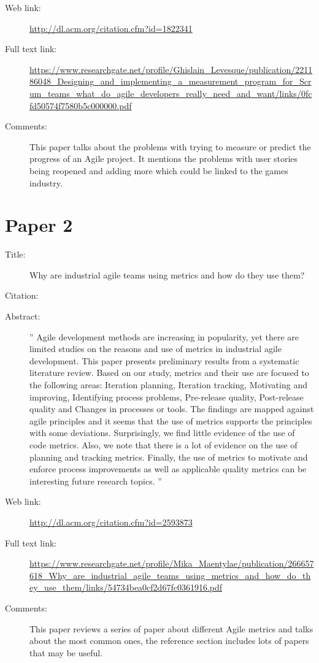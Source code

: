 \documentclass{scrartcl}
\begin{document}
\begin{description}
	\item[Web link:] \url{http://dl.acm.org/citation.cfm?id=1822341}
	\item[Full text link:] \url{https://www.researchgate.net/profile/Ghislain_Levesque/publication/221186048_Designing_and_implementing_a_measurement_program_for_Scrum_teams_what_do_agile_developers_really_need_and_want/links/0fcfd50574f7580b5c000000.pdf}
	\item[Comments:] This paper talks about the problems with trying to measure or predict the progress of an Agile project. It mentions the problems with user stories being reopened and adding more which could be linked to the games industry. 
\end{description}

\section*{Paper 2}
\begin{description}
	\item[Title:] Why are industrial agile teams using metrics and how do they use them?
	\item[Citation:] \cite{Kupiainen}
	\item[Abstract:]'' Agile development methods are increasing in popularity, yet there are limited studies on the reasons and use of metrics in industrial agile development. This paper presents preliminary results from a systematic literature review. Based on our study, metrics and their use are focused to the following areas: Iteration planning, Iteration tracking, Motivating and improving, Identifying process problems, Pre-release quality, Post-release quality and Changes in processes or tools. The findings are mapped against agile principles and it seems that the use of metrics supports the principles with some deviations. Surprisingly, we find little evidence of the use of code metrics. Also, we note that there is a lot of evidence on the use of planning and tracking metrics. Finally, the use of metrics to motivate and enforce process improvements as well as applicable quality metrics can be interesting future research topics. ''
	\item[Web link:] \url{http://dl.acm.org/citation.cfm?id=2593873}
	\item[Full text link:] \url{https://www.researchgate.net/profile/Mika_Maentylae/publication/266657618_Why_are_industrial_agile_teams_using_metrics_and_how_do_they_use_them/links/54734bea0cf2d67fc0361916.pdf}
	\item[Comments:] This paper reviews a series of paper about different Agile metrics and talks about the most common ones, the reference section includes lots of papers that may be useful. 
\end{description}
\end{document}
